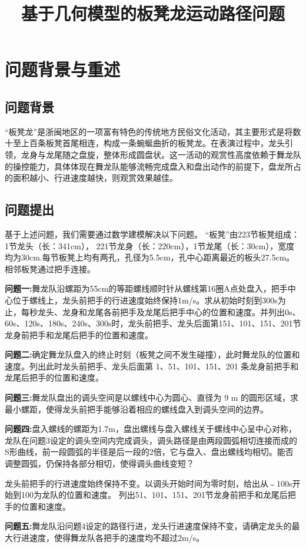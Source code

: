 \documentclass{cumcmthesis}
\title{基于几何模型的板凳龙运动路径问题}
\begin{document}
 \maketitle



\section{问题背景与重述}
\subsection{问题背景}
“板凳龙”是浙闽地区的一项富有特色的传统地方民俗文化活动，其主要形式是将数十至上百条板凳首尾相连，构成一条蜿蜒曲折的板凳龙。在表演过程中，龙头引领，龙身与龙尾随之盘旋，整体形成圆盘状。这一活动的观赏性高度依赖于舞龙队的操控能力，具体体现在舞龙队能够流畅完成盘入和盘出动作的前提下，盘龙所占的面积越小、行进速度越快，则观赏效果越佳。  
\subsection{问题提出}
基于上述问题，我们需要通过数学建模解决以下问题。
“板凳”由223节板凳组成：1节龙头（长：341cm）， 221节龙身（长：220cm），1节龙尾（长：30cm），宽度均为30cm.每节板凳上均有两孔，孔径为5.5cm，孔中心距离最近的板头27.5cm。相邻板凳通过把手连接。
\par\textbf{问题一:}舞龙队沿螺距为55cm的等距螺线顺时针从螺线第16圈A点处盘入，把手中心位于螺线上，龙头前把手的行进速度始终保持1m/s。求从初始时刻到300s为止，每秒龙头、龙身和龙尾各前把手及龙尾后把手中心的位置和速度。并列出0s、60s、120s、180s、240s、300s时，龙头前把手、龙头后面第151、101、151、201节龙身前把手和龙尾后把手的位置和速度。
\par\textbf{问题二:}确定舞龙队盘入的终止时刻（板凳之间不发生碰撞），此时舞龙队的位置和速度。列出此时龙头前把手、龙头后面第 1、51、101、151、201 条龙身前把手和龙尾后把手的位置和速度。
\par\textbf{问题三:}舞龙队盘出的调头空间是以螺线中心为圆心、直径为 9 m 的圆形区域，求最小螺距，使得龙头前把手能够沿着相应的螺线盘入到调头空间的边界。
\par\textbf{问题四:}盘入螺线的螺距为1.7m，盘出螺线与盘入螺线关于螺线中心呈中心对称，龙队在问题3设定的调头空间内完成调头，调头路径是由两段圆弧相切连接而成的S形曲线，前一段圆弧的半径是后一段的2倍，它与盘入、盘出螺线均相切。能否调整圆弧，仍保持各部分相切，使得调头曲线变短？
\par 龙头前把手的行进速度始终保持不变。以调头开始时间为零时刻，给出从﹣100s开始到100为龙队的位置和速度。
列出51、101、151、201节龙身前把手和龙尾后把手的位置和速度。
\par\textbf{问题五:}舞龙队沿问题4设定的路径行进，龙头行进速度保持不变，请确定龙头的最大行进速度，使得舞龙队各把手的速度均不超过2m/s。
\end{document}
